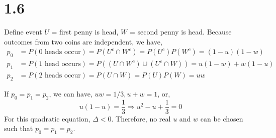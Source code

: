\documentclass[letter]{article}
\begin{document}

    \section*{1.6}
    Define event $U$ = {first penny is head}, $W$ = {second penny is head}. 
    Because outcomes from two coins are independent, we have,
    \begin{align*}
    p_0 & = P(\text{0 heads occur}) = P(U^c \cap W^c) = P(U^c)P(W^c) = (1-u)(1-w) \\
    p_1 & = P(\text{1 head occurs}) = P((U \cap W^c) \cup (U^c \cap W)) = u(1-w) + w(1-u) \\
    p_2 & = P(\text{2 heads occur}) = P(U \cap W) = P(U)P(W) = uw
    \end{align*}

    If $p_0 = p_1 = p_2$, we can have, $uw = 1/3, u + w = 1$, or,
    \[ u(1-u) = \frac{1}{3} \Rightarrow u^2 - u + \frac{1}{3} = 0 \]
    For this quadratic equation, $\Delta < 0$. Therefore, no real $u$ and $w$ can be chosen such that $p_0 = p_1 = p_2$.
\end{document}
